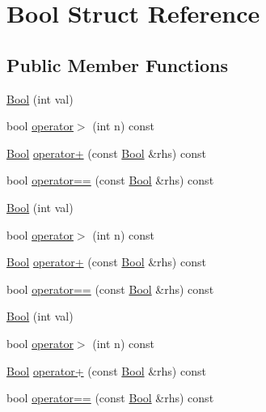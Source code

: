 \hypertarget{struct_bool}{}\section{Bool Struct Reference}
\label{struct_bool}
\subsection*{Public Member Functions}
\begin{DoxyCompactItemize}
\item 
\mbox{\hyperlink{struct_bool_a03dfd4851b13abb29414887fcada7fca}{Bool}} (int val)
\item 
bool \mbox{\hyperlink{struct_bool_a7baecbc58992eb06157fbbbaa560be0b}{operator$>$}} (int n) const
\item 
\mbox{\hyperlink{struct_bool}{Bool}} \mbox{\hyperlink{struct_bool_a6f4ecdec19082e896cffce66e6b6e7cc}{operator+}} (const \mbox{\hyperlink{struct_bool}{Bool}} \&rhs) const
\item 
bool \mbox{\hyperlink{struct_bool_afe799a4977c5ebe4c215d5d4ebd77adb}{operator==}} (const \mbox{\hyperlink{struct_bool}{Bool}} \&rhs) const
\item 
\mbox{\hyperlink{struct_bool_a03dfd4851b13abb29414887fcada7fca}{Bool}} (int val)
\item 
bool \mbox{\hyperlink{struct_bool_a7baecbc58992eb06157fbbbaa560be0b}{operator$>$}} (int n) const
\item 
\mbox{\hyperlink{struct_bool}{Bool}} \mbox{\hyperlink{struct_bool_a6f4ecdec19082e896cffce66e6b6e7cc}{operator+}} (const \mbox{\hyperlink{struct_bool}{Bool}} \&rhs) const
\item 
bool \mbox{\hyperlink{struct_bool_afe799a4977c5ebe4c215d5d4ebd77adb}{operator==}} (const \mbox{\hyperlink{struct_bool}{Bool}} \&rhs) const
\item 
\mbox{\hyperlink{struct_bool_a03dfd4851b13abb29414887fcada7fca}{Bool}} (int val)
\item 
bool \mbox{\hyperlink{struct_bool_a7baecbc58992eb06157fbbbaa560be0b}{operator$>$}} (int n) const
\item 
\mbox{\hyperlink{struct_bool}{Bool}} \mbox{\hyperlink{struct_bool_a6f4ecdec19082e896cffce66e6b6e7cc}{operator+}} (const \mbox{\hyperlink{struct_bool}{Bool}} \&rhs) const
\item 
bool \mbox{\hyperlink{struct_bool_afe799a4977c5ebe4c215d5d4ebd77adb}{operator==}} (const \mbox{\hyperlink{struct_bool}{Bool}} \&rhs) const
\end{DoxyCompactItemize}
